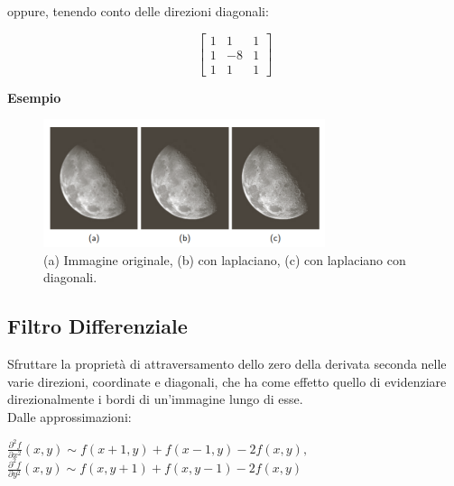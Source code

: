 oppure, tenendo conto delle direzioni diagonali:

\begin{center}
    \[
        \begin{bmatrix}
            1 & 1  & 1 \\
            1 & -8 & 1 \\
            1 & 1  & 1
        \end{bmatrix}
    \]
\end{center}

\textbf{Esempio}

\begin{figure}[H]
    \centering
    \includegraphics[width=\linewidth, keepaspectratio]{capitoli/immagini/imgs/laplaciano.png}
    \caption*{(a) Immagine originale, (b) con laplaciano, (c) con laplaciano con
        diagonali.}
\end{figure}

\subsection{Filtro Differenziale}

Sfruttare la proprietà di attraversamento dello zero della derivata seconda nelle varie direzioni, coordinate e diagonali, che ha come effetto quello di evidenziare direzionalmente i bordi di un'immagine lungo di esse.
\\Dalle approssimazioni:

\begin{center}
    $\frac{\partial^2{f}}{\partial{x}^2}(x,y) \sim f(x+1,y)+f(x-1,y)-2f(x,y),$
    \\$\frac{\partial^2{f}}{\partial{y}^2}(x,y) \sim f(x,y+1)+f(x,y-1)-2f(x,y)$
\end{center}

